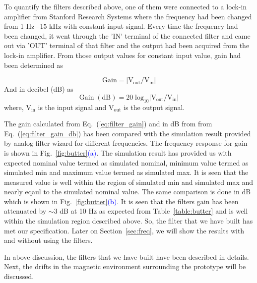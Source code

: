 To quantify the filters described above, one of them were connected to a lock-in amplifier from Stanford Research Systems where the frequency had been changed from 1 Hz$-$15 kHz with constant input signal. Every time the frequency had been changed, it went through the 'IN' terminal of the connected filter and came out via 'OUT'  terminal of that filter and the output had been acquired from the lock-in amplifier. From those output values for constant input value, gain had been determined  as 

\begin{equation}\label{eq:filter_gain}
    \mathrm{Gain=|V_{out}/V_{in}|}
\end{equation}
And in decibel (dB) as
\begin{equation}\label{eq:filter_gain_db}
    \mathrm{Gain\;(dB)=20\;log_{10}|V_{out}/V_{in}|}
\end{equation}
where, $\mathrm{V_{in}}$ is the input signal and $\mathrm{V_{out}}$ is the output signal.

The gain calculated from Eq.~(\ref{eq:filter_gain}) and in dB from from Eq.~(\ref{eq:filter_gain_db}) has been compared with the simulation result provided by analog filter wizard for different frequencies. The frequency response for gain is shown in Fig.~\ref{fig:butter}\textcolor{blue}{(a)}. The simulation result has provided us with expected nominal value termed as simulated nominal, minimum value termed as simulated min and maximum value termed as simulated max. It is seen that the measured value is well within the region of simulated min and simulated max and nearly eqaul to the simulated nominal value. The same comparison is done in dB which is shown in Fig.~\ref{fig:butter}\textcolor{blue}{(b)}. It is seen that the filters gain has been attenuated by $\sim$3 dB at 10 Hz as expected from Table~\ref{table:butter} and is well within the simulation region described above. So, the filter that we have built has met our specification. Later on Section~\ref{sec:freq}, we will show the results with and without using the filters.


In above discussion, the filters that we have built have been described in details. Next, the drifts in the magnetic environment surrounding the prototype will be discussed.







